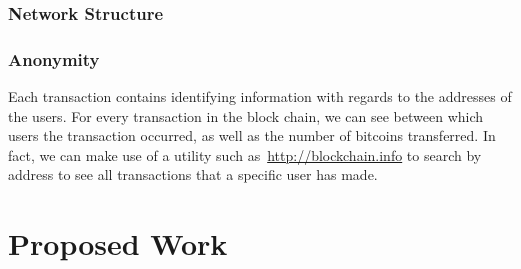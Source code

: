 \documentclass[11pt]{article}
\begin{document}
\subsubsection{Network Structure}

\subsubsection{Anonymity}
Each transaction contains identifying information with regards to the addresses
of the users. For every transaction in the block chain, we can see between which
users the transaction occurred, as well as the number of bitcoins transferred.
In fact, we can make use of a utility such as~\url{http://blockchain.info} to
search by address to see all transactions that a specific user has made.

\section{Proposed Work}


\end{document}

